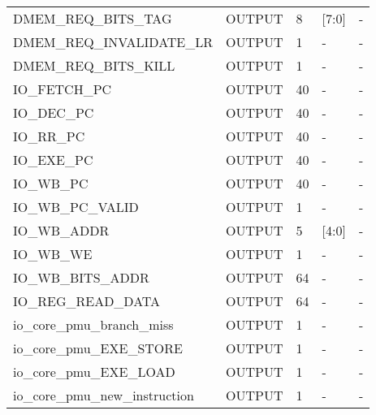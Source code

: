 \begin{table}[H]
\begin{tabular}{lllll}
		DMEM\_REQ\_BITS\_TAG            & OUTPUT    & 8     & {[}7:0{]}  & -       \\
		DMEM\_REQ\_INVALIDATE\_LR       & OUTPUT    & 1     & -          & -       \\
		DMEM\_REQ\_BITS\_KILL           & OUTPUT    & 1     & -          & -       \\
		IO\_FETCH\_PC                   & OUTPUT    & 40    & -          & -       \\
		IO\_DEC\_PC                     & OUTPUT    & 40    & -          & -       \\
		IO\_RR\_PC                      & OUTPUT    & 40    & -          & -       \\
		IO\_EXE\_PC                     & OUTPUT    & 40    & -          & -       \\
		IO\_WB\_PC                      & OUTPUT    & 40    & -          & -       \\
		IO\_WB\_PC\_VALID               & OUTPUT    & 1     & -          & -       \\
		IO\_WB\_ADDR                    & OUTPUT    & 5     & {[}4:0{]}  & -       \\
		IO\_WB\_WE                      & OUTPUT    & 1     & -          & -       \\
		IO\_WB\_BITS\_ADDR              & OUTPUT    & 64    & -          & -       \\
		IO\_REG\_READ\_DATA             & OUTPUT    & 64    & -          & -       \\
		io\_core\_pmu\_branch\_miss     & OUTPUT    & 1     & -          & -       \\
		io\_core\_pmu\_EXE\_STORE       & OUTPUT    & 1     & -          & -       \\
		io\_core\_pmu\_EXE\_LOAD        & OUTPUT    & 1     & -          & -       \\
		io\_core\_pmu\_new\_instruction & OUTPUT    & 1     & -          & -       \\
	\end{tabular}
\end{table}